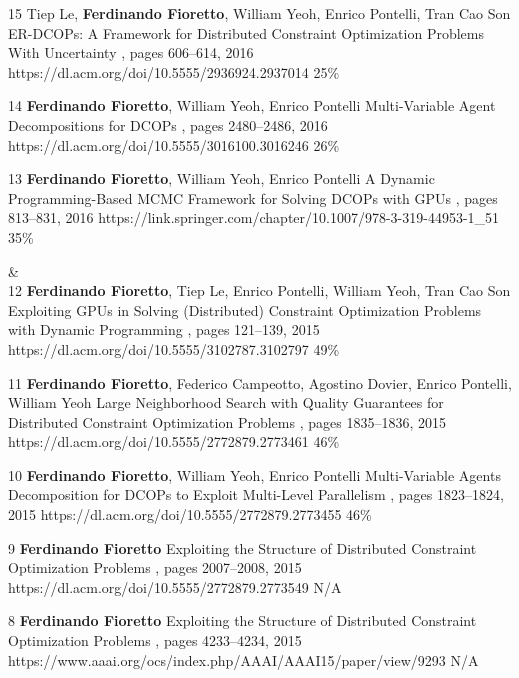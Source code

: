 \begin{pubs}
	\confentry 
		{15} %
		{Tiep Le, {\bf Ferdinando Fioretto}, William Yeoh, Enrico Pontelli, Tran Cao Son} 
		{ER-DCOPs: A Framework for Distributed Constraint Optimization Problems With Uncertainty} 
		{\procAAMAS,	pages 606--614, 2016}
		{https://dl.acm.org/doi/10.5555/2936924.2937014}
		{25\%}%

	\confentry 
		{14} %
		{{\bf Ferdinando Fioretto}, William Yeoh, Enrico Pontelli}
		{Multi-Variable Agent Decompositions for DCOPs}
		{\procAAAI, pages 2480--2486, 2016}
		{https://dl.acm.org/doi/10.5555/3016100.3016246}
		{26\%}%

	\confentry
		{13} %
		{{\bf Ferdinando Fioretto}, William Yeoh, Enrico Pontelli}
		{A Dynamic Programming-Based MCMC Framework for Solving DCOPs with GPUs}
		{\procCP, pages 813--831,	2016}
		{https://link.springer.com/chapter/10.1007/978-3-319-44953-1\_51}
		{35\%}%

{}&\nemph{\rule{0.5\linewidth}{0.5pt}}\\[1em]
	\confentry
		{12} %
		{{\bf Ferdinando Fioretto}, Tiep Le, Enrico Pontelli, William Yeoh, Tran Cao Son}
		{Exploiting GPUs in Solving (Distributed) Constraint Optimization Problems with Dynamic Programming}
		{\procCP, pages 121--139, 2015}
		{https://dl.acm.org/doi/10.5555/3102787.3102797}
		{49\%}%

	\confentry
		{11} %
		{{\bf Ferdinando Fioretto}, Federico Campeotto, Agostino Dovier, Enrico Pontelli, William Yeoh}
		{Large Neighborhood Search with Quality Guarantees for Distributed Constraint Optimization Problems}
		{\procAAMAS, pages 1835--1836, 2015}
		{https://dl.acm.org/doi/10.5555/2772879.2773461}
		{46\%}

	\confentry
		{10} %
		{{\bf Ferdinando Fioretto}, William Yeoh, Enrico Pontelli}
		{Multi-Variable Agents Decomposition for DCOPs to Exploit Multi-Level Parallelism}
		{\procAAMAS, pages 1823--1824, 2015}
		{https://dl.acm.org/doi/10.5555/2772879.2773455}
		{46\%}

	\confentry
		{9} %
		{{\bf Ferdinando Fioretto}}
		{Exploiting the Structure of Distributed Constraint Optimization Problems} 
		{\procAAMAS, pages 2007--2008, 2015}
		{https://dl.acm.org/doi/10.5555/2772879.2773549}
		{N/A}

	\confentry
		{8} %
		{{\bf Ferdinando Fioretto}} 
		{Exploiting the Structure of Distributed Constraint Optimization Problems}
		{\procAAAI,  pages 4233--4234, 2015}
		{https://www.aaai.org/ocs/index.php/AAAI/AAAI15/paper/view/9293}
		{N/A}


\end{pubs}
